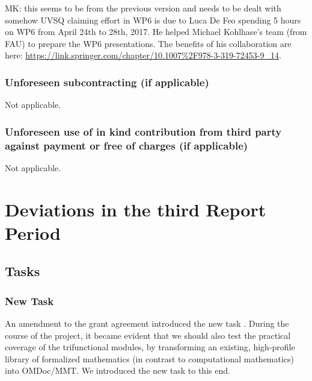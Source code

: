 \begin{oldpart}{MK: this seems to be from the previous version and needs to be dealt with somehow}
UVSQ claiming effort in WP6 is due to Luca De Feo spending 5 hours on WP6 from April 24th to 28th, 2017. He helped Michael 
Kohlhase's team (from FAU) to prepare the WP6 presentations. The benefits of his collaboration are here:
\url{https://link.springer.com/chapter/10.1007%2F978-3-319-72453-9_14}.

\subsubsection{Unforeseen subcontracting (if applicable)}

Not applicable.

\subsubsection{Unforeseen use of in kind contribution from third party against payment or
  free of charges (if applicable)}

 Not applicable. 
\end{oldpart}


\section{Deviations in the third Report Period}

\subsection{Tasks}

\subsubsection{New Task }
An amendment to the grant agreement introduced the new task .
During the course of the project, it became evident that we should also test the practical coverage of the trifunctional modules, by
transforming an existing, high-profile library of formalized mathematics (in contrast to computational mathematics) into OMDoc/MMT.
We introduced the new task to this end.

